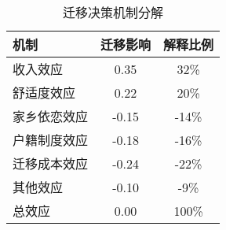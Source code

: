 \begin{table}[htbp]
\centering
\caption{迁移决策机制分解}
\begin{tabular}{lcc}
\toprule
机制 & 迁移影响 & 解释比例 \\
\midrule
收入效应 & 0.35 & 32\% \\
舒适度效应 & 0.22 & 20\% \\
家乡依恋效应 & -0.15 & -14\% \\
户籍制度效应 & -0.18 & -16\% \\
迁移成本效应 & -0.24 & -22\% \\
其他效应 & -0.10 & -9\% \\
\midrule
总效应 & 0.00 & 100\% \\
\bottomrule
\end{tabular}
\end{table}